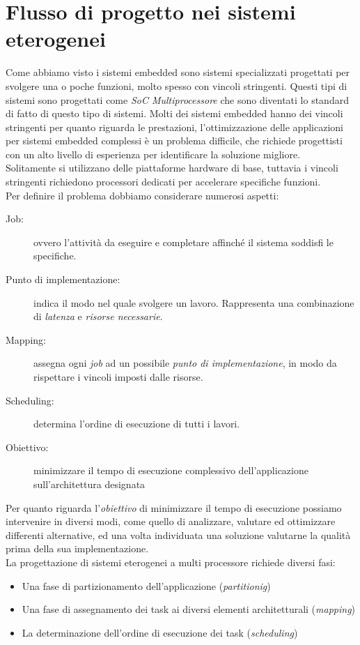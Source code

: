 \section{Flusso di progetto nei sistemi eterogenei}\label{capitolo3}
Come abbiamo visto i sistemi embedded sono sistemi specializzati progettati per svolgere una o poche funzioni, molto spesso con vincoli stringenti. Questi tipi di sistemi sono progettati come \emph{SoC Multiprocessore} che sono diventati lo  standard di fatto di questo tipo di sistemi. Molti dei sistemi embedded hanno dei vincoli stringenti per quanto riguarda le prestazioni, l'ottimizzazione delle applicazioni per sistemi embedded complessi è un problema difficile, che richiede progettisti con un alto livello di esperienza per identificare la soluzione migliore.\\
Solitamente si utilizzano delle piattaforme hardware di base, tuttavia i vincoli stringenti richiedono processori dedicati per accelerare specifiche funzioni.\\
Per definire il problema dobbiamo considerare numerosi aspetti:
\begin{description}
\item[Job:] ovvero l'attività da eseguire e completare affinché il sistema soddisfi le specifiche.
\item[Punto di implementazione:] indica il modo nel quale svolgere un lavoro. Rappresenta una combinazione di \emph{latenza} e \emph{risorse necessarie}.
\item[Mapping:] assegna ogni \emph{job} ad un possibile \emph{punto di implementazione}, in modo da rispettare i vincoli imposti dalle risorse.
\item[Scheduling:] determina l'ordine di esecuzione di tutti i lavori.
\item[Obiettivo:] minimizzare il tempo di esecuzione complessivo dell'applicazione sull'architettura designata
\end{description}
Per quanto riguarda l'\emph{obiettivo} di minimizzare il tempo di esecuzione possiamo intervenire in diversi modi, come quello di analizzare, valutare ed ottimizzare differenti alternative, ed una volta individuata una soluzione valutarne la qualità prima della sua implementazione.\\
La progettazione di sistemi eterogenei a multi processore richiede diversi fasi:
\begin{itemize}
\item Una fase di partizionamento dell'applicazione (\emph{partitionig})
\item Una fase di assegnamento dei task ai diversi elementi architetturali (\emph{mapping})
\item La determinazione dell'ordine di esecuzione dei task (\emph{scheduling})
\end{itemize}
